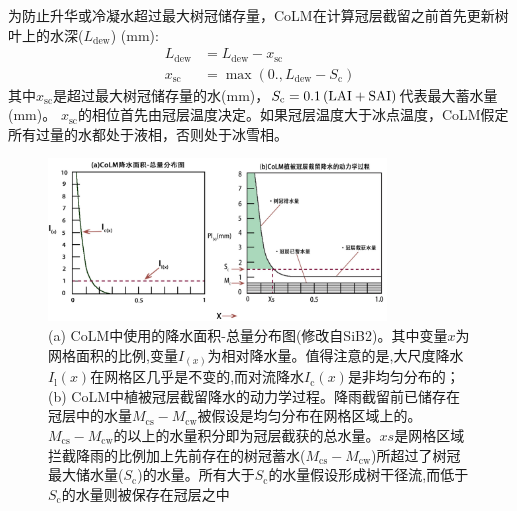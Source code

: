 为防止升华或冷凝水超过最大树冠储存量，CoLM在计算冠层截留之前首先更新树叶上的水深($L_{\mathrm{dew}}$) (mm):
\begin{equation}
  \begin{aligned}
    L_{\mathrm{dew}} &= L_{\mathrm{dew}}-x_{\mathrm{sc}} \\
    x_{\mathrm{s c}} &= \max\left(0., L_{\mathrm{dew}}-S_{\mathrm{c}}\right)
  \end{aligned}
\end{equation}
其中$x_{\mathrm{sc}}$是超过最大树冠储存量的水(mm)，$S_{\mathrm {c}} =0.1\left({\rm LAI}+{\rm SAI}\right)$代表最大蓄水量(mm)。
$x_{\mathrm{sc}}$的相位首先由冠层温度决定。如果冠层温度大于冰点温度，CoLM假定所有过量的水都处于液相，否则处于冰雪相。
{
  \begin{figure}[htbp]
    \centering
    \includegraphics[width=0.8\textwidth]{Figures/植被冠层和土壤水分/CoLM冠层截留示意图.jpg}
    \caption[(a) CoLM中使用的降水面积-总量分布图；(b) CoLM中植被冠层截留降水的动力学过程]{(a) CoLM中使用的降水面积-总量分布图(修改自SiB2)。其中变量$x$为网格面积的比例,变量$I_{\left(x\right)}$为相对降水量。值得注意的是,大尺度降水$I_{\mathrm {l}} \left(x\right)$在网格区几乎是不变的,而对流降水$I_{\mathrm {c}} \left(x\right)$是非均匀分布的；(b) CoLM中植被冠层截留降水的动力学过程。降雨截留前已储存在冠层中的水量$M_{\mathrm{cs}}-M_{\mathrm{cw}}$被假设是均匀分布在网格区域上的。$M_{\mathrm{cs}}-M_{\mathrm{cw}}$的以上的水量积分即为冠层截获的总水量。$xs$是网格区域拦截降雨的比例加上先前存在的树冠蓄水($M_{\mathrm{cs}}-M_{\mathrm{cw}}$)所超过了树冠最大储水量($S_{\mathrm {c}} $)的水量。所有大于$S_{\mathrm {c}} $的水量假设形成树干径流,而低于$S_{\mathrm {c}} $的水量则被保存在冠层之中}
    \label{fig:CoLM冠层截留示意图}
  \end{figure}
}

